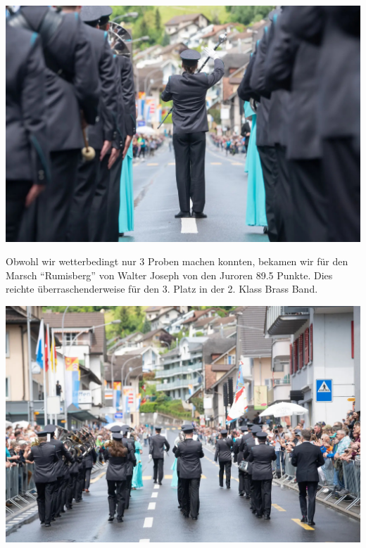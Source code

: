 \begin{history}
    \begin{MulticolFigure}
        \centering
        \includegraphics[width=0.93\linewidth]{./chap/2001-2024/2024/Wolhusen-1.jpg}
    \end{MulticolFigure}

    Obwohl wir wetterbedingt nur 3 Proben machen konnten,
    bekamen wir für den Marsch \enquote{Rumisberg} von Walter Joseph von den
    Juroren 89.5 Punkte. Dies reichte überraschenderweise für den 3. Platz in
    der 2. Klass Brass Band.

    \begin{MulticolFigure}
        \centering
        \includegraphics[width=0.93\linewidth]{./chap/2001-2024/2024/Wolhusen-3.jpg}
    \end{MulticolFigure}

\end{history}

